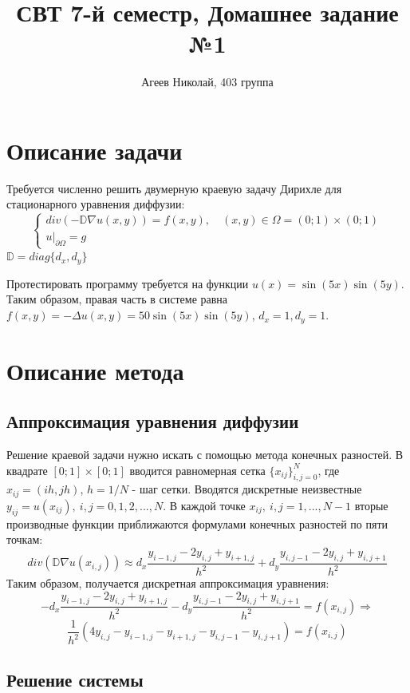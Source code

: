\documentclass{article}
\title{СВТ 7-й семестр, Домашнее задание №1}
\author{Агеев Николай, 403 группа}
\begin{document}
\maketitle

\section{Описание задачи}

Требуется численно решить двумерную краевую задачу Дирихле для стационарного уравнения диффузии:
$$
\begin{cases}
div(-\mathbb{D} \nabla u(x, y)) = f(x, y), \quad (x, y) \in \Omega = (0; 1)\times(0; 1) \\
u\vert_{\partial \Omega} = g
\end{cases}
$$
$\mathbb{D} = diag\{d_x, d_y\}$

Протестировать программу требуется на функции $u(x) = \sin (5x) \sin (5y)$. Таким образом, правая часть в системе равна $f(x, y) = -\Delta u(x, y) = 50 \sin (5x) \sin (5y)$, $d_x = 1, d_y = 1$.

\section{Описание метода}

\subsection{Аппроксимация уравнения диффузии}

Решение краевой задачи нужно искать с помощью метода конечных разностей. 
В квадрате $[0; 1]\times[0; 1]$ вводится равномерная сетка $\{x_{ij}\}_{i, j = 0}^N$, где $x_{ij} = (ih, jh)$, $h = 1 / N$ - шаг сетки. Вводятся дискретные неизвестные $y_{ij} = u(x_{ij}), \ i,j = 0, 1, 2, ... , N$. В каждой точке $x_{ij}, \ i, j = 1, ... , N - 1$ вторые производные функции приближаются формулами конечных разностей по пяти точкам:
$$
div(\mathbb{D}\nabla u(x_{i,j})) \approx d_x\frac{y_{i - 1, j} - 2y_{i, j} + y_{i + 1, j}}{h^2} + d_y\frac{y_{i, j - 1} - 2y_{i, j} + y_{i, j + 1}}{h^2}
$$
Таким образом, получается дискретная аппроксимация уравнения:
$$
-d_x\frac{y_{i - 1, j} - 2y_{i, j} + y_{i + 1, j}}{h^2} - d_y\frac{y_{i, j - 1} - 2y_{i, j} + y_{i, j + 1}}{h^2} = f(x_{i, j})
\Longrightarrow
$$
$$\frac{1}{h^2} \left ( 4y_{i,j} - y_{i - 1, j} - y_{i+1, j} - y_{i, j-1} - y_{i, j+1}\right ) = f(x_{i,j})$$

\subsection{Решение системы}
\end{document}
